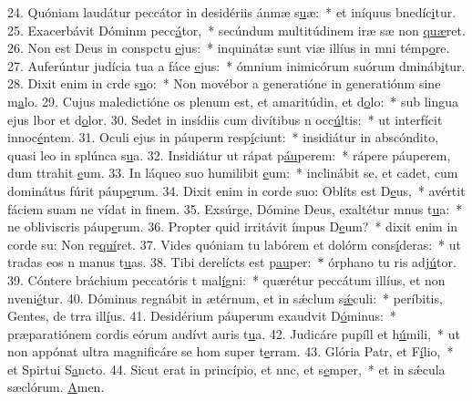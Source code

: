 24. Quóniam laudátur peccátor in desidériis ánmæ s\uline{u}æ:~* et iníquus bnedíc\uline{i}tur.
25. Exacerbávit Dóminm pecc\uline{á}tor,~* secúndum multitúdinem iræ sæ non \uline{quæ}ret.
26. Non est Deus in conspctu \uline{e}jus:~* inquinátæ sunt viæ illíus in mni témp\uline{o}re.
27. Auferúntur judícia tua a fáce \uline{e}jus:~* ómnium inimicórum suórum dmináb\uline{i}tur.
28. Dixit enim in crde s\uline{u}o:~* Non movébor a generatióne in generatiónm sine m\uline{a}lo.
29. Cujus maledictióne os plenum est, et amaritúdin, et d\uline{o}lo:~* sub lingua ejus lbor et d\uline{o}lor.
30. Sedet in insídiis cum divítibus n occ\uline{ú}ltis:~* ut interfícit innoc\uline{é}ntem.
31. Oculi ejus in páuperm resp\uline{í}ciunt:~* insidiátur in abscóndito, quasi leo in splúnca s\uline{u}a.
32. Insidiátur ut rápat p\uline{áu}perem:~* rápere páuperem, dum ttrahit \uline{e}um.
33. In láqueo suo humilibit \uline{e}um:~* inclinábit se, et cadet, cum dominátus fúrit páup\uline{e}rum.
34. Dixit enim in corde suo: Oblíts est D\uline{e}us,~* avértit fáciem suam ne vídat in f\uline{i}nem.
35. Exsúrge, Dómine Deus, exaltétur mnus t\uline{u}a:~* ne obliviscris páup\uline{e}rum.
36. Propter quid irritávit ímpus D\uline{e}um?~* dixit enim in corde su: Non re\uline{quí}ret.
37. Vides quóniam tu labórem et dolórm cons\uline{í}deras:~* ut tradas eos n manus t\uline{u}as.
38. Tibi derelícts est p\uline{au}per:~* órphano tu ris adj\uline{ú}tor.
39. Cóntere bráchium peccatóris t mal\uline{í}gni:~* quærétur peccátum illíus, et non nveni\uline{é}tur.
40. Dóminus regnábit in ætérnum, et in sǽclum s\uline{ǽ}culi:~* períbitis, Gentes, de trra ill\uline{í}us.
41. Desidérium páuperum exaudvit D\uline{ó}minus:~* præparatiónem cordis eórum audívt auris t\uline{u}a.
42. Judicáre pupíll et h\uline{ú}mili,~* ut non appónat ultra magnificáre se hom super t\uline{e}rram.
43. Glória Patr, et F\uline{í}lio,~* et Spirtui S\uline{a}ncto.
44. Sicut erat in princípio, et nnc, et s\uline{e}mper,~* et in sǽcula sæclórum. \uline{A}men.
